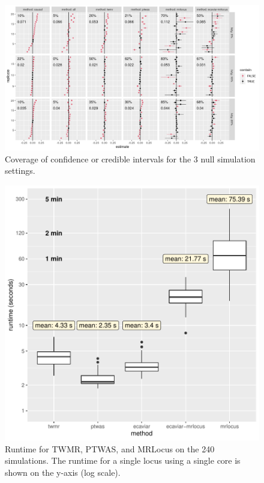 \documentclass[11pt]{article}
\newcommand{\Ncase}{$N_{\textrm{case}}$\xspace}
\newcommand{\Ncontrol}{$N_{\textrm{control}}$\xspace}
\begin{document}
\begin{figure}[!ht]
  \centering
  \includegraphics[width=\textwidth]{figs/nullplot.png}
  \caption{Coverage of confidence or credible intervals for the 3 null
    simulation settings.}
\end{figure}

\begin{figure}[!ht]
  \centering
  \includegraphics[width=.7\textwidth]{figs/runtime}
  \caption{Runtime for TWMR, PTWAS, and MRLocus on the 240
    simulations. The runtime for a single locus using a single core is
    shown on the y-axis (log scale).}
\end{figure}

\end{document}
